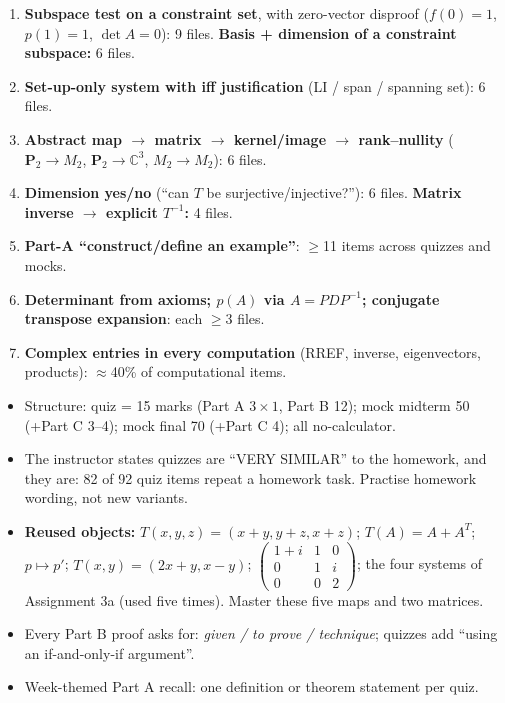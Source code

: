 \begin{enumerate}[leftmargin=1.5em,itemsep=0pt,topsep=1pt]
\item \textbf{Subspace test on a constraint set}, with zero-vector disproof ($f(0)=1$, $p(1)=1$, $\det A=0$): 9 files. \textbf{Basis + dimension of a constraint subspace:} 6 files.
\item \textbf{Set-up-only system with iff justification} (LI / span / spanning set): 6 files.
\item \textbf{Abstract map $\to$ matrix $\to$ kernel/image $\to$ rank--nullity} ($\mathbf P_2\to M_2$, $\mathbf P_2\to\mathbb C^3$, $M_2\to M_2$): 6 files.
\item \textbf{Dimension yes/no} (``can $T$ be surjective/injective?''): 6 files. \textbf{Matrix inverse $\to$ explicit $T^{-1}$:} 4 files.
\item \textbf{Part-A ``construct/define an example''}: $\ge$11 items across quizzes and mocks.
\item \textbf{Determinant from axioms; $p(A)$ via $A=PDP^{-1}$; conjugate transpose expansion}: each $\ge$3 files.
\item \textbf{Complex entries in every computation} (RREF, inverse, eigenvectors, products): $\approx$40\% of computational items.
\end{enumerate}
\begin{itemize}[leftmargin=1.2em,itemsep=0pt,topsep=1pt]
\item Structure: quiz = 15 marks (Part A $3\times1$, Part B 12); mock midterm 50 (+Part C 3--4); mock final 70 (+Part C 4); all no-calculator.
\item The instructor states quizzes are ``VERY SIMILAR'' to the homework, and they are: 82 of 92 quiz items repeat a homework task. Practise homework wording, not new variants.
\item \textbf{Reused objects:} $T(x,y,z)=(x{+}y,y{+}z,x{+}z)$; $T(A)=A+A^T$; $p\mapsto p'$; $T(x,y)=(2x{+}y,x{-}y)$; $\begin{pmatrix}1{+}i&1&0\\0&1&i\\0&0&2\end{pmatrix}$; the four systems of Assignment 3a (used five times). Master these five maps and two matrices.
\item Every Part B proof asks for: \emph{given / to prove / technique}; quizzes add ``using an if-and-only-if argument''.
\item Week-themed Part A recall: one definition or theorem statement per quiz.
\end{itemize}
